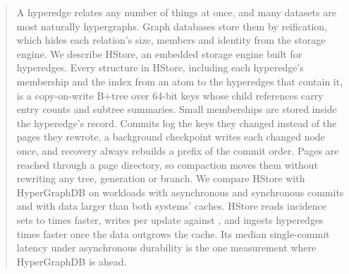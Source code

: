 \begin{abstract}
A hyperedge relates any number of things at once, and many datasets are most naturally hypergraphs. Graph databases store them by reification, which hides each relation's size, members and identity from the storage engine. We describe HStore, an embedded storage engine built for hyperedges. Every structure in HStore, including each hyperedge's membership and the index from an atom to the hyperedges that contain it, is a copy-on-write B+tree over 64-bit keys whose child references carry entry counts and subtree summaries. Small memberships are stored inside the hyperedge's record. Commits log the keys they changed instead of the pages they rewrote, a background checkpoint writes each changed node once, and recovery always rebuilds a prefix of the commit order. Pages are reached through a page directory, so compaction moves them without rewriting any tree, generation or branch. We compare HStore with HyperGraphDB on  workloads with asynchronous and synchronous commits and with data larger than both systems' caches. HStore reads incidence sets  to  times faster, writes  per update against , and ingests hyperedges  times faster once the data outgrows the cache. Its median single-commit latency under asynchronous durability is the one measurement where HyperGraphDB is ahead.
\end{abstract}
